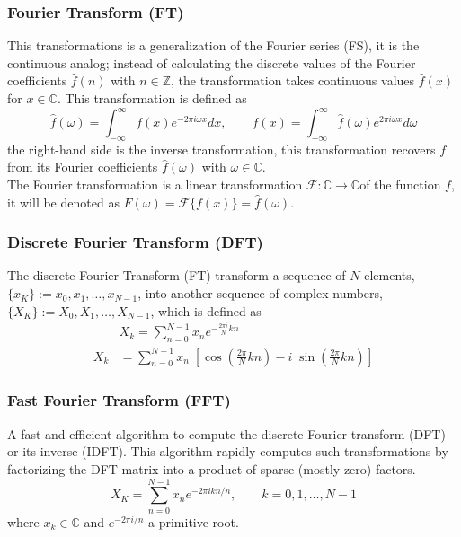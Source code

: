 \subsubsection{Fourier Transform (FT)}

This transformations is a generalization of the Fourier series (FS), it is the continuous analog; instead of calculating the discrete values of the Fourier coefficients $\hat{f}(n)$ with $n\in \mathbb{Z}$, the transformation takes continuous values $\hat{f}(x)$ for $x\in \mathbb{C}$. This transformation is defined as 
\begin{equation}\label{eq:fouerir_transform}
    \hat{f}(\omega) = \int_{-\infty}^{\infty} f(x) e^{-2\pi i \omega x} dx, \qquad f(x) = \int_{-\infty}^{\infty} \hat{f}(\omega) e^{2\pi i \omega x} d\omega
\end{equation}
the right-hand side is the inverse transformation, this transformation recovers $f$ from its Fourier coefficients $\hat{f}(\omega)$ with $\omega\in \mathbb{C}$.\\

The Fourier transformation is a linear transformation $\mathcal{F}: \mathbb{C} \to \mathbb{C}$of the function $f$, it will be denoted as $F(\omega)=\mathcal{F} \{ f(x)\} = \hat{f} (\omega)$.


\subsubsection{Discrete Fourier Transform (DFT) }

The discrete Fourier Transform (FT) transform a sequence of $N$ elements,$\{x_K\}:=x_0, x_1,\dots, x_{N-1}$, into another sequence of complex numbers, $\{X_K\}:=X_0, X_1,\dots, X_{N-1}$, which is defined as
\begin{align}\label{eq:FT}
    &X_k  = \sum_{n=0}^{N-1} x_n e^{-\frac{2\pi i}{N}kn} \\ 
    X_k &= \sum_{n=0}^{N-1} x_n \; \left[\cos \left( \frac{2\pi}{N}kn\right) -i \;  \sin \left(\frac{2\pi}{N}kn \right)\right]
\end{align}


\subsubsection{Fast Fourier Transform (FFT)}

A fast and efficient algorithm to compute the discrete Fourier transform (DFT) or its inverse (IDFT). This algorithm rapidly computes such transformations by factorizing the DFT matrix into a product of sparse (mostly zero) factors. \cite{signal_book_modern}
\begin{equation}\label{FFT}
    X_K = \sum_{n=0}^{N-1} x_n e^{-2\pi ikn/n}, \qquad k=0,1,\dots, N-1
\end{equation}
where $x_k\in \mathbb{C}$ and $e^{-2\pi i/n}$ a primitive root.

